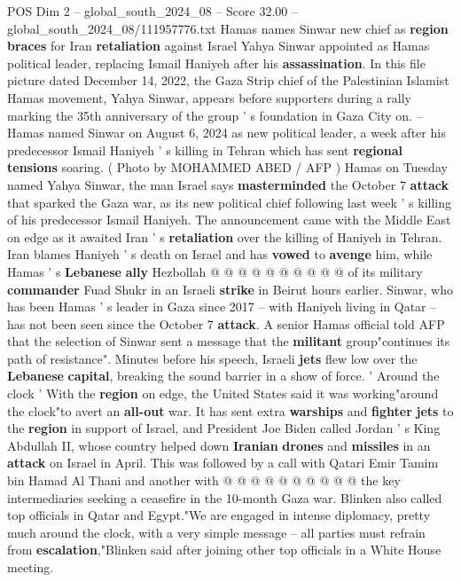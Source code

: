 \begin{textsample}{POS Dim 2 – global\_south\_2024\_08 – Score 32.00 – global\_south\_2024\_08/111957776.txt}  \label{ex:f2_pos_008}
Hamas names Sinwar new chief as \textbf{region} \textbf{braces} for Iran \textbf{retaliation} against Israel Yahya Sinwar appointed as Hamas political leader, replacing Ismail Haniyeh after his \textbf{assassination}.
In this file picture dated December 14, 2022, the Gaza Strip chief of the Palestinian Islamist Hamas movement, Yahya Sinwar, appears before supporters during a rally marking the 35th anniversary of the group ' s foundation in Gaza City on. -- Hamas named Sinwar on August 6, 2024 as new political leader, a week after his predecessor Ismail Haniyeh ' s killing in Tehran which has sent \textbf{regional} \textbf{tensions} soaring. ( Photo by MOHAMMED ABED / AFP ) Hamas on Tuesday named Yahya Sinwar, the man Israel says \textbf{masterminded} the October 7 \textbf{attack} that sparked the Gaza war, as its new political chief following last week ' s killing of his predecessor Ismail Haniyeh.
The announcement came with the Middle East on edge as it awaited Iran ' s \textbf{retaliation} over the killing of Haniyeh in Tehran.
Iran blames Haniyeh ' s death on Israel and has \textbf{vowed} to \textbf{avenge} him, while Hamas ' s \textbf{Lebanese} \textbf{ally} Hezbollah @ @ @ @ @ @ @ @ @ @ of its military \textbf{commander} Fuad Shukr in an Israeli \textbf{strike} in Beirut hours earlier.
Sinwar, who has been Hamas ' s leader in Gaza since 2017 -- with Haniyeh living in Qatar -- has not been seen since the October 7 \textbf{attack}.
A senior Hamas official told AFP that the selection of Sinwar sent a message that the \textbf{militant} group"continues its path of resistance".
Minutes before his speech, Israeli \textbf{jets} flew low over the \textbf{Lebanese} \textbf{capital}, breaking the sound barrier in a show of force. ' Around the clock ' With the \textbf{region} on edge, the United States said it was working"around the clock"to avert an \textbf{all-out} war.
It has sent extra \textbf{warships} and \textbf{fighter} \textbf{jets} to the \textbf{region} in support of Israel, and President Joe Biden called Jordan ' s King Abdullah II, whose country helped down \textbf{Iranian} \textbf{drones} and \textbf{missiles} in an \textbf{attack} on Israel in April.
This was followed by a call with Qatari Emir Tamim bin Hamad Al Thani and another with @ @ @ @ @ @ @ @ @ @ the key intermediaries seeking a ceasefire in the 10-month Gaza war.
Blinken also called top officials in Qatar and Egypt."We are engaged in intense diplomacy, pretty much around the clock, with a very simple message -- all parties must refrain from \textbf{escalation},"Blinken said after joining other top officials in a White House meeting.

\end{textsample}
